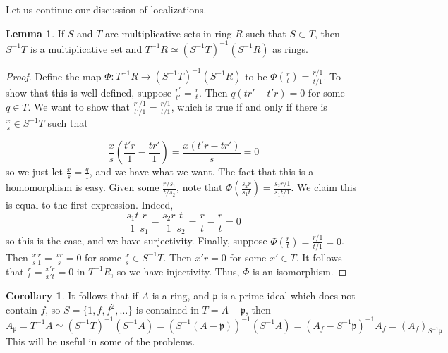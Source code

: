 \documentclass[aps,pra,showpacs,notitlepage,onecolumn,superscriptaddress,nofootinbib]{revtex4-1}
\theoremstyle{definition}
\newtheorem{lemma}{Lemma}[section]
\newtheorem{corollary}{Corollary}[theorem]
\begin{document}
\noindent Let us continue our discussion of localizations.

\begin{lemma}
  \label{lem:s2}
  If $S$ and $T$ are multiplicative sets in ring $R$ such that $S \subset T$, then $S^{-1} T$ is a multiplicative set and $T^{-1} R \simeq (S^{-1} T)^{-1} (S^{-1} R)$ as rings.
  \end{lemma}

\begin{proof}
Define the map $\Phi : T^{-1} R \rightarrow (S^{-1} T)^{-1} (S^{-1} R)$ to be $\Phi(\frac{r}{t}) = \frac{r/1}{t/1}$. To show that this is well-defined, suppose $\frac{r'}{t'} = \frac{r}{t}$. Then
$q (t r' - t' r) = 0$ for some $q \in T$. We want to show that $\frac{r'/1}{t'/1} = \frac{r/1}{t/1}$, which is true if and only if there is $\frac{x}{s} \in S^{-1} T$ such that

\begin{equation}
  \frac{x}{s} \left( \frac{t' r}{1} - \frac{t r'}{1} \right) = \frac{x (t' r - t r')}{s} = 0
  \end{equation}
so we just let $\frac{x}{s} = \frac{q}{1}$, and we have what we want. The fact that this is a homomorphism is easy. Given some $\frac{r/s_1}{t/s_2}$, note that $\Phi(\frac{s_2 r}{s_1 t}) = \frac{s_2 r / 1}{s_1 t / 1}$.
We claim this is equal to the first expression. Indeed,
\begin{equation}
  \frac{s_1 t}{1} \frac{r}{s_1} - \frac{s_2 r}{1} \frac{t}{s_2} = \frac{r}{t} - \frac{r}{t} = 0
  \end{equation}
so this is the case, and we have surjectivity. Finally, suppose $\Phi(\frac{r}{t}) = \frac{r/1}{t/1} = 0$. Then $\frac{x}{s} \frac{r}{1} = \frac{xr}{s} = 0$ for some $\frac{x}{s} \in S^{-1} T$. Then $x' r = 0$ for some $x' \in T$.
It follows that $\frac{r}{t} = \frac{x' r}{x' t} = 0$ in $T^{-1} R$, so we have injectivity. Thus, $\Phi$ is an isomorphism.
  \end{proof}

\begin{corollary}
  \label{cor:s3}
  It follows that if $A$ is a ring, and $\mathfrak{p}$ is a prime ideal which does not contain $f$, so $S = \{1, f, f^2, \dots\}$ is contained in $T = A - \mathfrak{p}$, then
  \begin{equation}
    A_{\mathfrak{p}} = T^{-1} A \simeq (S^{-1} T)^{-1} (S^{-1} A) = (S^{-1} (A - \mathfrak{p}))^{-1} (S^{-1} A) = (A_f - S^{-1} \mathfrak{p})^{-1} A_f = (A_f)_{S^{-1} \mathfrak{p}}
    \end{equation}
  This will be useful in some of the problems.
  \end{corollary}
\end{document}
